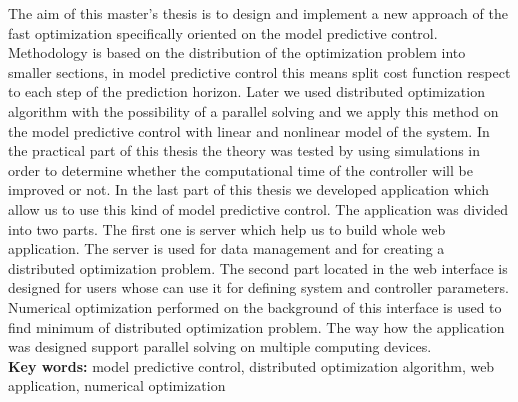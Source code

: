 The aim of this master’s thesis is to design and implement a new approach of the fast optimization specifically oriented on the model predictive control. Methodology is based on the distribution of the optimization problem into smaller sections, in model predictive control this means split cost function respect to each step of the prediction horizon. Later we used distributed optimization algorithm with the possibility of a parallel solving and we apply this method on the model predictive control with linear and nonlinear model of the system. In the practical part of this thesis the theory was tested by using simulations in order to determine whether the computational time of the controller will be improved or not. In the last part of this thesis we developed application which allow us to use this kind of model predictive control. The application was divided into two parts. The first one is server which help us to build whole web application. The server is used for data management and for creating a distributed optimization problem. The second part located in the web interface is designed for users whose can use it for defining system and controller parameters. Numerical optimization performed on the background of this interface is used to find minimum of distributed optimization problem. The way  how the application was  designed support parallel solving on multiple computing devices.\\
\textbf{Key words:} model predictive control, distributed optimization algorithm, web application, numerical optimization
